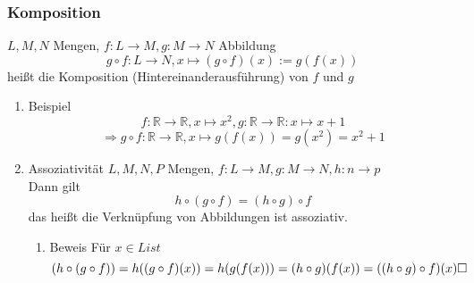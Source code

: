 \documentclass[11pt]{article}
\begin{document}
\subsubsection{Komposition}
\label{sec-2-6-6}
$L,M,N$ Mengen, $f:L\to M,g:M\to N$ Abbildung \\
    \[g\circ f: L\to N, x\mapsto(g\circ f)(x):=g(f(x))\]
heißt die Komposition (Hintereinanderausführung) von $f$ und $g$
\begin{enumerate}
\item Beispiel
\label{sec-2-6-6-1}
\[f:\mathbb{R}\to\mathbb{R},x\mapsto x^2, g:\mathbb{R}\to\mathbb{R}:x\mapsto x + 1\]
\[\Rightarrow g\circ f:\mathbb{R}\to\mathbb{R},x\mapsto g(f(x)) = g(x^2) = x^2 + 1\]
\item Assoziativität
\label{sec-2-6-6-2}
$L,M,N,P$ Mengen, $f:L\to M, g:M\to N,h:n\to p$ \\
     Dann gilt
\[h\circ (g\circ f) = (h\circ g)\circ f\]
das heißt die Verknüpfung von Abbildungen ist assoziativ.
\begin{enumerate}
\item Beweis
\label{sec-2-6-6-2-1}
Für $x\in L ist$ \\
      \[(h\circ (g\circ f)) = h((g\circ f)(x)) = h(g(f(x))) = (h\circ g)(f(x)) = ((h\circ g)\circ f)(x)\hfill\square\]
\end{enumerate}
\end{enumerate}
\end{document}
